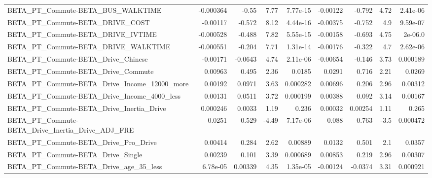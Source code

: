 \begin{tabular}{lrrrrrrrr}
BETA\_PT\_Commute-BETA\_BUS\_WALKTIME                  &   -0.000364 &        -0.55 &     7.77 & 7.77e-15 &   -0.00122 &      -0.792 &         4.72 &      2.41e-06 \\
BETA\_PT\_Commute-BETA\_DRIVE\_COST                    &    -0.00117 &       -0.572 &     8.12 & 4.44e-16 &   -0.00375 &      -0.752 &          4.9 &      9.59e-07 \\
BETA\_PT\_Commute-BETA\_DRIVE\_IVTIME                  &   -0.000528 &       -0.488 &     7.82 & 5.55e-15 &   -0.00158 &      -0.693 &         4.75 &       2e-06.0 \\
BETA\_PT\_Commute-BETA\_DRIVE\_WALKTIME                &   -0.000551 &       -0.204 &     7.71 & 1.31e-14 &   -0.00176 &      -0.322 &          4.7 &      2.62e-06 \\
BETA\_PT\_Commute-BETA\_Drive\_Chinese                 &    -0.00171 &      -0.0643 &     4.74 & 2.11e-06 &   -0.00654 &      -0.146 &         3.73 &      0.000189 \\
BETA\_PT\_Commute-BETA\_Drive\_Commute                 &     0.00963 &        0.495 &     2.36 &   0.0185 &     0.0291 &       0.716 &         2.21 &        0.0269 \\
BETA\_PT\_Commute-BETA\_Drive\_Income\_12000\_more       &     0.00192 &       0.0971 &     3.63 & 0.000282 &    0.00696 &       0.206 &         2.96 &       0.00312 \\
BETA\_PT\_Commute-BETA\_Drive\_Income\_4000\_less        &     0.00131 &       0.0511 &     3.72 & 0.000199 &    0.00388 &       0.092 &         3.14 &       0.00167 \\
BETA\_PT\_Commute-BETA\_Drive\_Inertia\_Drive           &    0.000246 &       0.0033 &     1.19 &    0.236 &    0.00032 &     0.00254 &         1.11 &         0.265 \\
BETA\_PT\_Commute-BETA\_Drive\_Inertia\_Drive\_ADJ\_FRE   &      0.0251 &        0.529 &    -4.49 & 7.17e-06 &      0.088 &       0.763 &         -3.5 &      0.000472 \\
BETA\_PT\_Commute-BETA\_Drive\_Pro\_Drive               &     0.00414 &        0.284 &     2.62 &  0.00889 &     0.0132 &       0.501 &          2.1 &        0.0357 \\
BETA\_PT\_Commute-BETA\_Drive\_Single                  &     0.00239 &        0.101 &     3.39 & 0.000689 &    0.00853 &       0.219 &         2.96 &       0.00307 \\
BETA\_PT\_Commute-BETA\_Drive\_age\_35\_less             &    6.78e-05 &      0.00339 &     4.35 & 1.35e-05 &   -0.00124 &     -0.0374 &         3.31 &      0.000921 \\

\end{tabular}
